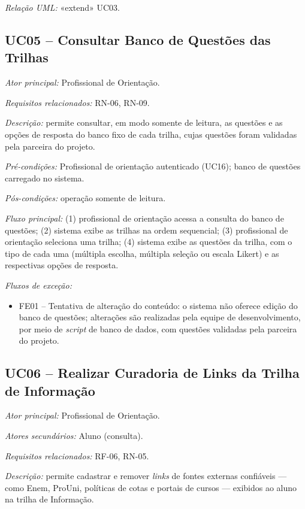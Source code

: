 \textit{Relação UML:} «extend» UC03.

\subsection*{UC05 -- Consultar Banco de Questões das Trilhas}\label{uc:uc05}

\textit{Ator principal:} Profissional de Orientação.

\textit{Requisitos relacionados:} RN-06, RN-09.

\textit{Descrição:} permite consultar, em modo somente de leitura, as questões e as opções de resposta do banco fixo de cada trilha, cujas questões foram validadas pela parceira do projeto.

\textit{Pré-condições:} Profissional de orientação autenticado (UC16); banco de questões carregado no sistema.

\textit{Pós-condições:} operação somente de leitura.

\textit{Fluxo principal:} (1) profissional de orientação acessa a consulta do banco de questões; (2) sistema exibe as trilhas na ordem sequencial; (3) profissional de orientação seleciona uma trilha; (4) sistema exibe as questões da trilha, com o tipo de cada uma (múltipla escolha, múltipla seleção ou escala Likert) e as respectivas opções de resposta.

\textit{Fluxos de exceção:}

\begin{itemize}[label={},leftmargin=\parindent,itemsep=0pt,topsep=0pt]
  \item FE01 – Tentativa de alteração do conteúdo: o sistema não oferece edição do banco de questões; alterações são realizadas pela equipe de desenvolvimento, por meio de \textit{script} de banco de dados, com questões validadas pela parceira do projeto.
\end{itemize}

\subsection*{UC06 -- Realizar Curadoria de Links da Trilha de Informação}\label{uc:uc06}

\textit{Ator principal:} Profissional de Orientação.

\textit{Atores secundários:} Aluno (consulta).

\textit{Requisitos relacionados:} RF-06, RN-05.

\textit{Descrição:} permite cadastrar e remover \textit{links} de fontes externas confiáveis — como Enem, ProUni, políticas de cotas e portais de cursos — exibidos ao aluno na trilha de Informação.

